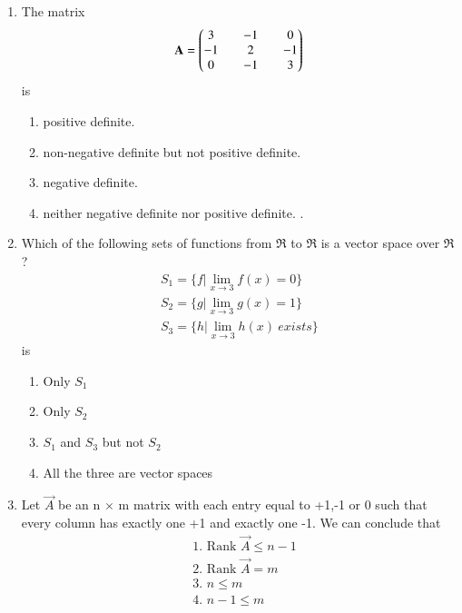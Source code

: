 \renewcommand{\theequation}{\theenumi}
\renewcommand{\thefigure}{\theenumi}
\renewcommand{\thetable}{\theenumi}
\begin{enumerate}[label=\thesection.\arabic*.,ref=\thesection.\theenumi]

\item The matrix
\begin{align}
\mathbf{A} = \begin{pmatrix}3 && -1 && 0 \\ -1 && 2 && -1\\ 0 && -1 && 3\end{pmatrix}
\end{align}
is
\begin{enumerate}
\item positive definite.
\item non-negative definite but not positive definite.
\item negative definite. 
\item neither negative definite nor positive definite. .
\end{enumerate}
%
\solution

\item Which of the following sets of functions from $\Re$ to $\Re$ is a vector space over $\Re$?
\begin{align}
S_1 = \{f|\lim_{x\to3} f(x) = 0\}\\
S_2 = \{g|\lim_{x\to3} g(x) = 1\}\\
S_3 = \{h|\lim_{x\to3} h(x)~exists\}
\end{align}
is
\begin{enumerate}
\item Only $S_1$ 
\item Only $S_2$
\item $S_1$ and $S_3$ but not $S_2$ 
\item All the three are vector spaces
\end{enumerate}
%
\solution

\item Let $\vec{A}$ be an n $\times$ m matrix with each entry equal to +1,-1 or 0 such that every column has exactly one +1 and exactly one -1. We can conclude that\\
\begin{align}
    &\mbox{1. Rank } \vec{A}\leq n-1\\
    &\mbox{2. Rank } \vec{A}=m\\    
    &\mbox{3. }n\leq m\\
    &\mbox{4. }n-1\leq m
\end{align}

\end{enumerate}
